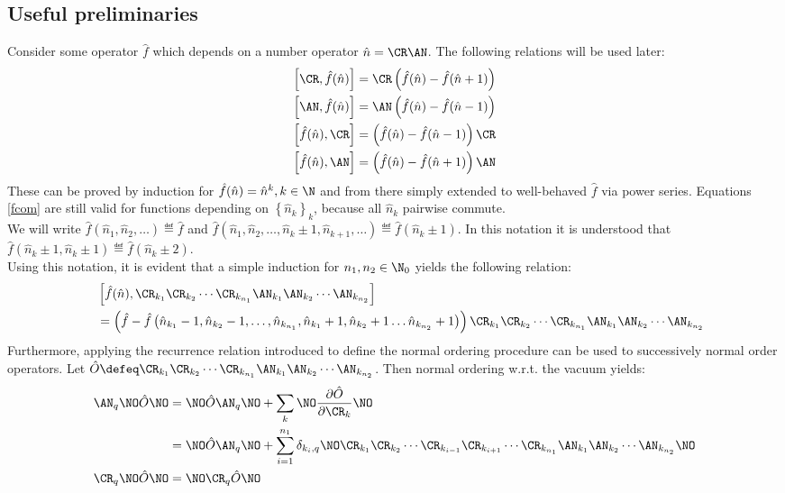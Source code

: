 \begin{appendix}
\subsection{Useful preliminaries}
Consider some operator $\hat f$ which depends on a number operator $\hat n=\CR\AN$. The following relations will be used later:
\begin{subequations}
\label{fcom}
\begin{align}
\left[\CR,\hat f(\hat n) \right] &= \CR\left(\hat f(\hat n)-\hat f(\hat n+1)\right)\\ 
\left[\AN,\hat f(\hat n) \right] &= \AN\left(\hat f(\hat n)-\hat f(\hat n-1)\right)\\
\left[\hat f(\hat n),\CR \right] &= \left(\hat f(\hat n)-\hat f(\hat n-1)\right)\CR\\
\left[\hat f(\hat n),\AN \right] &= \left(\hat f(\hat n)-\hat f(\hat n+1)\right)\AN
\end{align}
\end{subequations}
These can be proved by induction for $\hat f(\hat n)=\hat n^k, k\in\N$ and from there simply extended to well-behaved $\hat f$ via power series. Equations \ref{fcom} are still valid for functions depending on $\left\{\hat n_k\right\}_k$, because all $\hat n_k$ pairwise commute.\\
We will write $\hat f\left(\hat n_1,\hat n_2,\hdots\right)\eqdef \hat f$ and $\hat f\left(\hat n_1,\hat n_2,\hdots,\hat n_k\pm 1,\hat n_{k+1},\hdots\right)\eqdef \hat f(\hat n_k\pm1)$. In this notation it is understood that $\hat f(\hat n_k\pm1,\hat n_{k}\pm1)\eqdef\hat f(\hat n_k\pm2)$.\\
Using this notation, it is evident that a simple induction for $n_1,n_2\in\N_0$ yields the following relation:
\begin{align}
&\left[\hat f(\hat n),\CR_{k_1}\CR_{k_2}\cdots\CR_{k_{n_1}}\AN_{k_1}\AN_{k_2}\cdots\AN_{k_{n_2}} \right] \nonumber \\ \quad& 
= \left(\hat f-\hat f\left(\hat n_{k_1}-1,\hat n_{k_2}-1,\hdots,\hat n_{k_{n_1}},\hat n_{k_1}+1,\hat n_{k_2}+1\hdots\hat n_{k_{n_2}}+1\right)\right)\CR_{k_1}\CR_{k_2}\cdots\CR_{k_{n_1}}\AN_{k_1}\AN_{k_2}\cdots\AN_{k_{n_2}}
\end{align}
Furthermore, applying the recurrence relation introduced to define the normal ordering procedure can be used to successively normal order operators. Let $\hat O\defeq \CR_{k_1}\CR_{k_2}\cdots\CR_{k_{n_1}}\AN_{k_1}\AN_{k_2}\cdots\AN_{k_{n_2}}$. Then normal ordering w.r.t. the vacuum yields:
\begin{subequations}
\begin{align}
\AN_q\NO\hat O\NO &=\NO\hat O\AN_q\NO + \sum\limits_{k}\NO \frac{\partial \hat O}{\partial\CR_k}\NO \nonumber \\
 &= \NO\hat O\AN_q\NO + \sum\limits_{i=1}^{n_1}\delta_{k_i,q}\NO \CR_{k_1}\CR_{k_2}\cdots\CR_{k_{i-1}}\CR_{k_{i+1}}\cdots\CR_{k_{n_1}}\AN_{k_1}\AN_{k_2}\cdots\AN_{k_{n_2}}\NO \\
\CR_q\NO\hat O\NO &= \NO \CR_q\hat O\NO
\end{align}
\end{subequations}

\end{appendix}
